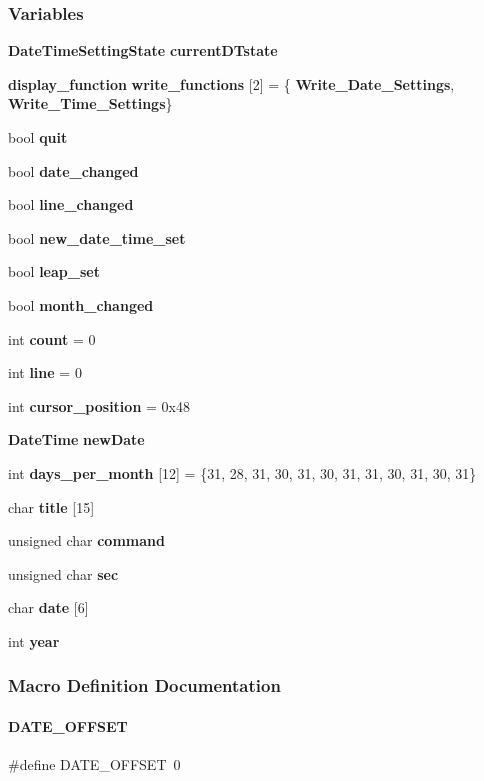 \subsubsection*{Variables}
\begin{DoxyCompactItemize}
\item 
\textbf{ Date\+Time\+Setting\+State} \textbf{ current\+D\+Tstate}
\item 
\textbf{ display\+\_\+function} \textbf{ write\+\_\+functions} [2] = \{\textbf{ Write\+\_\+\+Date\+\_\+\+Settings}, \textbf{ Write\+\_\+\+Time\+\_\+\+Settings}\}
\item 
bool \textbf{ quit}
\item 
bool \textbf{ date\+\_\+changed}
\item 
bool \textbf{ line\+\_\+changed}
\item 
bool \textbf{ new\+\_\+date\+\_\+time\+\_\+set}
\item 
bool \textbf{ leap\+\_\+set}
\item 
bool \textbf{ month\+\_\+changed}
\item 
int \textbf{ count} = 0
\item 
int \textbf{ line} = 0
\item 
int \textbf{ cursor\+\_\+position} = 0x48
\item 
\textbf{ Date\+Time} \textbf{ new\+Date}
\item 
int \textbf{ days\+\_\+per\+\_\+month} [12] = \{31, 28, 31, 30, 31, 30, 31, 31, 30, 31, 30, 31\}
\item 
char \textbf{ title} [15]
\item 
unsigned char \textbf{ command}
\item 
unsigned char \textbf{ sec}
\item 
char \textbf{ date} [6]
\item 
int \textbf{ year}
\end{DoxyCompactItemize}


\subsubsection{Macro Definition Documentation}
\mbox{\label{a00026_a4902403b9625ad0ff39668861e9d0b8e}} 
\paragraph{D\+A\+T\+E\+\_\+\+O\+F\+F\+S\+ET}
{\footnotesize\ttfamily \#define D\+A\+T\+E\+\_\+\+O\+F\+F\+S\+ET~0}

